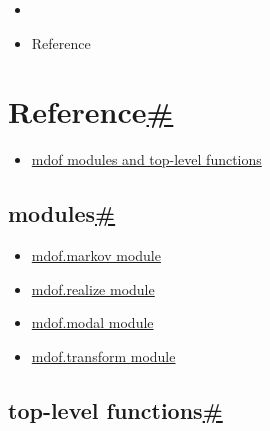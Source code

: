 \hypertarget{rtd-footer-container}{}

\hypertarget{main-content}{}
\begin{itemize}
\tightlist
\item
  \href{../index.html}{\emph{}}
\item
  Reference
\end{itemize}

\hypertarget{searchbox}{}

\hypertarget{reference}{}
\hypertarget{reference}{%
\section{\texorpdfstring{Reference\protect\hyperlink{reference}{\#}}{Reference\#}}\label{reference}}

\begin{itemize}
\tightlist
\item
  \protect\hyperlink{}{mdof modules and top-level functions}
\end{itemize}

\hypertarget{modules}{}
\hypertarget{modules}{%
\subsection{\texorpdfstring{modules\protect\hyperlink{modules}{\#}}{modules\#}}\label{modules}}

\begin{itemize}
\tightlist
\item
  \href{mdof.markov.html}{mdof.markov module}
\item
  \href{mdof.realize.html}{mdof.realize module}
\item
  \href{mdof.modal.html}{mdof.modal module}
\item
  \href{mdof.transform.html}{mdof.transform module}
\end{itemize}

\hypertarget{module-mdof}{}
\protect\hypertarget{top-level-functions}{}{}

\hypertarget{top-level-functions}{%
\subsection{\texorpdfstring{top-level
functions\protect\hyperlink{module-mdof}{\#}}{top-level functions\#}}\label{top-level-functions}}

